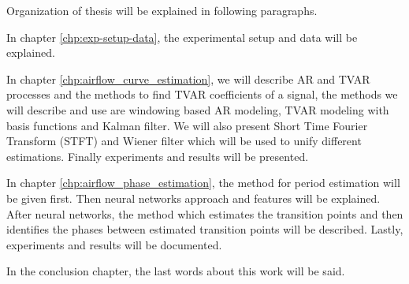 Organization of thesis will be explained in following paragraphs. \par
In chapter \ref{chp:exp-setup-data}, the experimental setup and data will be explained. \par 
In chapter \ref{chp:airflow_curve_estimation}, we will describe AR and TVAR processes and the methods to find TVAR coefficients of a signal, the methods we will describe and use are windowing based AR modeling, TVAR modeling with basis functions and Kalman filter. We will also present Short Time Fourier Transform (STFT) and Wiener filter which will be used to unify different estimations. Finally experiments and results will be presented. \par
In chapter \ref{chp:airflow_phase_estimation}, the method for period estimation will be given first. Then neural networks approach and features will be explained. After neural networks, the method which estimates the transition points and then identifies the phases between estimated transition points will be described. Lastly, experiments and results will be documented. \par 
In the conclusion chapter, the last words about this work will be said.
 